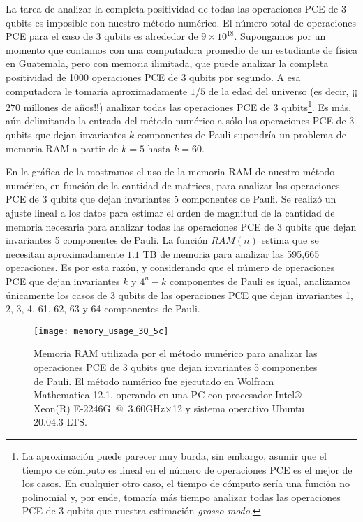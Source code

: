 
La tarea de analizar la completa positividad de todas las operaciones
PCE de 3 qubits es imposible con nuestro método numérico. 
El número total de operaciones PCE para el caso 
de 3 qubits es alrededor de $9\times10^{18}$. Supongamos por un momento
que contamos con una computadora promedio de un estudiante de física
en Guatemala, pero con memoria ilimitada, que puede analizar 
la completa positividad de 1000 operaciones PCE de 3 qubits por segundo. A esa 
computadora le tomaría aproximadamente $1/5$ de la edad del universo 
(es decir, ¡¡$270$ millones de años!!) analizar todas las operaciones PCE de 
3 qubits\footnote{ 
La aproximación puede parecer muy burda, sin embargo, asumir que el tiempo
de cómputo es lineal en el número de operaciones PCE es el mejor de los casos.
En cualquier otro caso, el tiempo de cómputo sería una función no polinomial
y, por ende, tomaría más tiempo analizar todas las operaciones PCE 
de 3 qubits que nuestra estimación \textit{grosso modo}.}.
Es más, aún delimitando la entrada del método numérico a sólo las operaciones
PCE de 3 qubits que dejan invariantes $k$ componentes de Pauli supondría 
un problema de memoria RAM a partir de $k=5$ hasta $k=60$.

En la gráfica de la  mostramos el uso de la 
memoria RAM de nuestro método numérico, en función de la cantidad de matrices, 
para analizar las operaciones PCE de 3 qubits que dejan invariantes 
5 componentes de Pauli. Se realizó un ajuste lineal a los datos para estimar 
el orden de magnitud de la cantidad de memoria necesaria para analizar todas 
las operaciones PCE de 3 qubits que dejan invariantes 5 componentes de Pauli.
La función $RAM(n)$ estima que se necesitan aproximadamente 
$1.1$ TB de memoria para analizar las 595,665 operaciones. 
Es por esta razón, y considerando que el número de operaciones PCE
que dejan invariantes $k$ y $4^n-k$ componentes de Pauli 
es igual, analizamos únicamente los casos de 3 qubits 
de las operaciones PCE que dejan invariantes 1, 2, 3, 4, 61, 62, 63 y 64 
componentes de Pauli. 
\begin{figure}
  \texttt{[image: memory\_usage\_3Q\_5c]}
  \caption{Memoria RAM utilizada por el método numérico para analizar las
  operaciones PCE de 3 qubits que dejan invariantes 5 componentes de Pauli.
  El método numérico fue ejecutado en Wolfram Mathematica 12.1, operando
  en una PC con procesador Intel® Xeon(R) E-2246G~@~3.60GHz×12 
  y sistema operativo Ubuntu 20.04.3 LTS. \ep}
  \label{fig:memory_usage_3Q_5c}
\end{figure}

